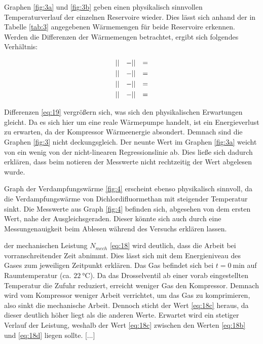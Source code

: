 \justifying Graphen \ref{fig:3a} und \ref{fig:3b} geben einen physikalisch sinnvollen Temperaturverlauf der einzelnen Reservoire 
wieder. Dies lässt sich anhand der in Tabelle \ref{tab:3} angegebenen Wärmemengen für beide Reservoire erkennen. Werden die Differenzen der 
Wärmemengen betrachtet, ergibt sich folgendes Verhältnis:

\begin{subequations} \label{eq:19}
\begin{align}
    &\lvert\text{}\rvert &- &\lvert\text{}\rvert &= &\text{} \label{eq:19a}\\
    &\lvert\text{}\rvert &- &\lvert\text{}\rvert &= &\text{} \label{eq:19b}\\
    &\lvert\text{}\rvert &- &\lvert\text{}\rvert &= &\text{} \label{eq:19c}\\
    &\lvert\text{}\rvert &- &\lvert\text{}\rvert &= &\text{} \label{eq:19d}
\end{align}
\end{subequations}

\justifying Differenzen \eqref{eq:19} vergrößern sich, was sich den physikalischen Erwartungen gleicht. Da es sich hier um 
eine reale Wärmepumpe handelt, ist ein Energieverlust zu erwarten, da der Kompressor Wärmeenergie absondert. Demnach sind die Graphen \ref{fig:3}
nicht deckungsgleich. Der neunte Wert im Graphen \ref{fig:3a} weicht von ein wenig von der nicht-linearen Regressionslinie ab. Dies ließe sich
dadurch erklären, dass beim notieren der Messwerte nicht rechtzeitig der Wert abgelesen wurde. 

\justifying Graph der Verdampfungswärme \ref{fig:4} erscheint ebenso physikalisch sinnvoll, da die Verdampfungswärme von 
Dichlordifluormethan mit steigender Temperatur sinkt. Die Messwerte aus Graph \ref{fig:4} befinden sich, abgesehen von dem ersten Wert, nahe 
der Ausgleichsgeraden. Dieser könnte sich auch durch eine Messungenauigkeit beim Ablesen während des Versuchs erklären lassen.

\justifying der mechanischen Leistung $N_{mech}$ \eqref{eq:18} wird deutlich, dass die Arbeit bei vorranschreitender Zeit abnimmt. 
Dies lässt sich mit dem Energieniveau des Gases zum jeweiligen Zeitpunkt erklären. Das Gas befindet sich bei $t = \SI{0}{\minute}$ auf Raumtemperatur
(ca. $\SI{22}{\celsius}$). Da das Drosselventil ab einer vorab eingestellten Temperatur die Zufuhr reduziert, erreicht weniger Gas den Kompressor.
Demnach wird vom Kompressor weniger Arbeit verrichtet, um das Gas zu komprimieren, also sinkt die mechanische Arbeit. Dennoch sticht der Wert 
\eqref{eq:18c} heraus, da dieser deutlich höher liegt als die anderen Werte. Erwartet wird ein stetiger Verlauf der Leistung, weshalb der Wert 
\eqref{eq:18c} zwischen den Werten \eqref{eq:18b} und \eqref{eq:18d} liegen sollte. [...]

